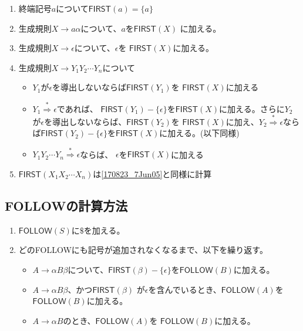 \documentclass[a4j,10pt]{jsarticle}
\begin{document}
\begin{enumerate}
 \item 終端記号$a$について$\mathsf{FIRST}(a) = \{a\}$
 \item 生成規則$X \rightarrow a\alpha$について、$a$を$\mathsf{FIRST}(X)$
       に加える。
 \item 生成規則$X \rightarrow \epsilon$について、$\epsilon$を
       $\mathsf{FIRST}(X)$に加える。
 \item 生成規則$X \rightarrow Y_1Y_2\cdots Y_n$について
       \begin{itemize}
	\item $Y_1$が$\epsilon$を導出しないならば$\mathsf{FIRST}(Y_1)$を
	      $\mathsf{FIRST}(X)$に加える
	\item $Y_1 \stackrel{*}{\Rightarrow} \epsilon$であれば、
	      $\mathsf{FIRST}(Y_1) - \{\epsilon\}$を$\mathsf{FIRST}(X)$に加える。さらに$Y_2$が$\epsilon$を導出しないならば、$\mathsf{FIRST}(Y_2)$を
	      $\mathsf{FIRST}(X)$に加え、$Y_2 \stackrel{*}{\Rightarrow}
	      \epsilon$ならば$\mathsf{FIRST}(Y_2) - \{\epsilon\}$を$\mathsf{FIRST}(X)$に加える。(以下同様)
	\item $Y_1Y_2\cdots Y_n \stackrel{*}{\Rightarrow} \epsilon$ならば、
	      $\epsilon$を$\mathsf{FIRST}(X)$に加える
	      \label{170823_7Jun05}
       \end{itemize}
 \item $\mathsf{FIRST}(X_1X_2\cdots X_n)$は\ref{170823_7Jun05}と同様に計算
\end{enumerate}

\subsection{FOLLOWの計算方法}

\begin{enumerate}
 \item $\mathsf{FOLLOW}(S)$に$\$$を加える。
 \item どの\textsf{FOLLOW}にも記号が追加されなくなるまで、以下を繰り返す。
       \begin{itemize}
	\item $A \rightarrow \alpha B\beta$について、$\mathsf{FIRST}(\beta)
	      - \{\epsilon\}$を$\mathsf{FOLLOW}(B)$に加える。
	\item $A \rightarrow \alpha B\beta$、かつ$\mathsf{FIRST}(\beta)$
	      が$\epsilon$を含んでいるとき、$\mathsf{FOLLOW}(A)$を
	      $\mathsf{FOLLOW}(B)$に加える。
	\item $A \rightarrow \alpha B$のとき、$\mathsf{FOLLOW}(A)$を
	      $\mathsf{FOLLOW}(B)$に加える。
       \end{itemize}
\end{enumerate}
\end{document}
